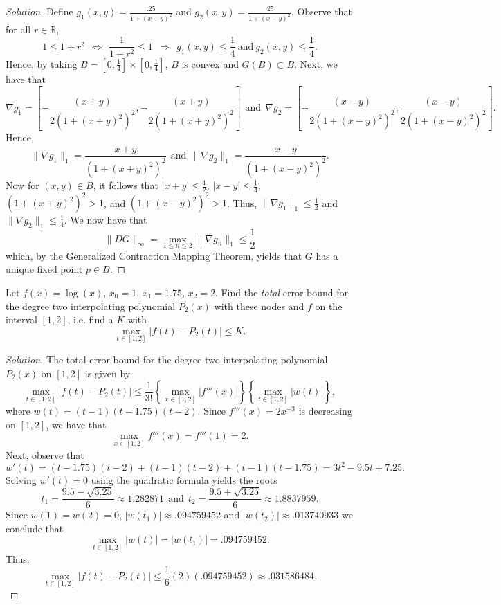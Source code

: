 \documentclass[8pt]{article}
\theoremstyle{definition}
\newenvironment{exercise}[1]
  {\renewcommand\theinnerexercise{#1}\innerexercise}
  {\endinnerexercise}
\begin{document}
\begin{proof}[Solution]
Define $\displaystyle g_1 (x, y) = \frac{.25}{1 + (x + y)^2}$ and $\displaystyle g_2 (x, y) = \frac{.25}{1 + (x - y)^2}$. Observe that for all $r \in \mathbb{R}$, $$1 \leq 1 + r^2 \ \ \Leftrightarrow \ \ \frac{1}{1 + r^2} \leq 1 \ \ \Rightarrow \ \ g_1 (x, y) \leq \frac{1}{4} \ \text{and} \ g_2 (x, y) \leq \frac{1}{4}.$$ Hence, by taking $\displaystyle B = \left[ 0, \frac{1}{4} \right] \times \left[ 0, \frac{1}{4} \right]$, $B$ is convex and $G(B) \subset B$. Next, we have that $$\nabla g_1 = \left[ - \frac{(x + y)}{2 ( 1 + (x + y)^2)^2}, - \frac{(x + y)}{2 ( 1 + (x + y)^2)^2} \right] \ \ \text{and} \ \ \nabla g_2 = \left[ - \frac{(x - y)}{2 ( 1 + (x - y)^2)^2}, \frac{(x - y)}{2 ( 1 + (x - y)^2)^2} \right].$$ Hence, $$\| \nabla g_1 \|_1 = \frac{|x + y|}{( 1 + (x + y)^2)^2} \ \ \text{and} \ \ \| \nabla g_2 \|_1 = \frac{|x - y|}{( 1 + (x - y)^2)^2}.$$ Now for $(x, y) \in B$, it follows that $|x + y| \leq \frac{1}{2}$, $|x - y| \leq \frac{1}{4}$, $(1 + (x + y)^2)^2 > 1$, and $(1 + (x - y)^2)^2 > 1$. Thus, $\| \nabla g_1 \|_1 \leq \frac{1}{2}$ and $\| \nabla g_2 \|_1 \leq \frac{1}{4}$. We now have that $$\| DG \|_{\infty} = \max_{1 \leq n \leq 2} \| \nabla g_n \|_1 \leq \frac{1}{2}$$ which, by the Generalized Contraction Mapping Theorem, yields that $G$ has a unique fixed point $p \in B$.
\end{proof}


\begin{exercise}{4}
Let $f(x) = \log (x)$, $x_0 = 1$, $x_1 = 1.75$, $x_2 = 2$. Find the \emph{total} error bound for the degree two interpolating polynomial $P_2 (x)$ with these nodes and $f$ on the interval $[1, 2]$, i.e. find a $K$ with $$\max_{t \in [1, 2]} |f(t) - P_2 (t)| \leq K.$$
\end{exercise}

\begin{proof}[Solution]
The total error bound for the degree two interpolating polynomial $P_2 (x)$ on $[1, 2]$	is given by $$\max_{t \in [1, 2]} |f(t) - P_2 (t)| \leq \frac{1}{3!} \left\{ \max_{x \in [1, 2]} |f'''(x)| \right\} \left\{ \max_{t \in [1, 2]} |w (t)| \right\},$$ where $w (t) = (t - 1) (t - 1.75) (t - 2)$. Since $f'''(x) = 2 x^{-3}$ is decreasing on $[1, 2]$, we have that $$\max_{x \in [1, 2]} f'''(x) = f'''(1) = 2.$$ Next, observe that $$w'(t) = (t - 1.75) (t - 2) + (t - 1) (t - 2) + (t - 1) (t - 1.75) = 3t^2 - 9.5 t + 7.25.$$ Solving $w'(t) = 0$ using the quadratic formula yields the roots $$t_1 = \frac{9.5 - \sqrt{3.25}}{6} \approx 1.282871 \ \ \text{and} \ \ t_2 = \frac{9.5 + \sqrt{3.25}}{6} \approx 1.8837959.$$ Since $w(1) = w(2) = 0$, $|w(t_1)| \approx .094759452$ and $| w(t_2) | \approx .013740933$ we conclude that $$\max_{t \in [1, 2]} |w (t)| = |w(t_1)| = .094759452.$$ Thus, $$\max_{t \in [1, 2]} |f(t) - P_2 (t)| \leq \frac{1}{6} (2)(.094759452) \approx .031586484.$$ %
\end{proof}
\end{document}
